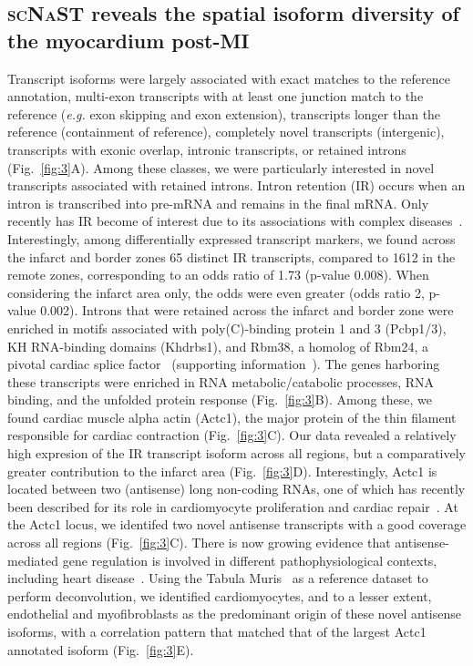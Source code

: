\documentclass[utf8]{FrontiersinHarvard} %
\newcommand{\eg}{\textit{e.g.}\xspace}
\newcommand{\scnast}{\textsc{scNaST}\xspace}
\begin{document}
\subsection*{\scnast reveals the spatial isoform diversity of the myocardium post-MI}
Transcript isoforms were largely associated with exact matches to the reference annotation, multi-exon transcripts with at least one junction match to the reference (\eg exon skipping and exon extension), transcripts longer than the reference (containment of reference), completely novel transcripts (intergenic), transcripts with exonic overlap, intronic transcripts, or retained introns (Fig.~\ref{fig:3}A). 
Among these classes, we were particularly interested in novel transcripts associated with retained introns. Intron retention (IR) occurs when an intron is transcribed into pre-mRNA and remains in the final mRNA. Only recently has IR become of interest due to its associations with complex diseases~\citep{Zhang2020:IR_cancer}.
Interestingly, among differentially expressed transcript markers, we found across the infarct and border zones 65 distinct IR transcripts, compared to 1612 in the remote zones, corresponding to an odds ratio of 1.73 (p-value 0.008). When considering the infarct area only, the odds were even greater (odds ratio 2, p-value 0.002).
Introns that were retained across the infarct and border zone were enriched in motifs associated with poly(C)-binding protein 1 and 3 (Pcbp1/3), KH RNA-binding domains (Khdrbs1), and Rbm38, a homolog of Rbm24, a pivotal cardiac splice factor~\citep{Weeland2015:AS_heart} (supporting information~).
The genes harboring these transcripts were enriched in RNA metabolic/catabolic processes, RNA binding, and the unfolded protein response (Fig.~\ref{fig:3}B).
Among these, we found cardiac muscle alpha actin (Actc1), the major protein of the thin filament responsible for cardiac contraction (Fig.~\ref{fig:3}C). 
Our data revealed a relatively high expresion of the IR transcript isoform across all regions, but a comparatively greater contribution to the infarct area (Fig.~\ref{fig:3}D).
Interestingly, Actc1 is located between two (antisense) long non-coding RNAs, one of which has recently been described for its role in cardiomyocyte proliferation and cardiac repair~\citep{Murugavel2019:lncPCR}.
At the Actc1 locus, we identifed two novel antisense transcripts with a good coverage across all regions (Fig.~\ref{fig:3}C).
There is now growing evidence that antisense-mediated gene regulation is involved in different pathophysiological contexts, including heart disease~\citep{Luther2005:antisense_cardiac,Zinad2017:NATs,Celik2019:Nppa-AS}.
Using the Tabula Muris~\citep{Schaum2018:Tabula_muris} as a reference dataset to perform deconvolution, we identified cardiomyocytes, and to a lesser extent, endothelial and myofibroblasts as the predominant origin of these novel antisense isoforms, with a correlation pattern that matched that of the largest Actc1 annotated isoform (Fig.~\ref{fig:3}E).
\end{document}
